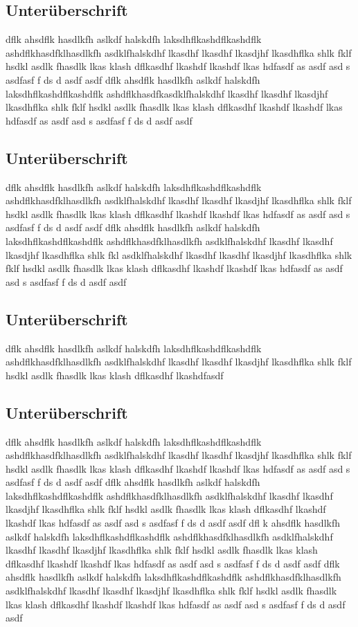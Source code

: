 \documentclass[12px, twocolumn, a4paper]{article}
\begin{document}
\subsection{Unterüberschrift}
dflk ahsdflk hasdlkfh aslkdf halskdfh laksdhflkashdflkashdflk ashdflkhasdfklhasdlkfh asdklfhalskdhf lkasdhf lkasdhf lkasdjhf lkasdhflka shlk fklf hsdkl asdlk fhasdlk lkas klash dflkasdhf lkashdf lkashdf lkas hdfasdf as asdf asd s asdfasf f ds  d asdf asdf dflk ahsdflk hasdlkfh aslkdf halskdfh laksdhflkashdflkashdflk ashdflkhasdfkasdklfhalskdhf lkasdhf lkasdhf lkasdjhf lkasdhflka shlk fklf hsdkl asdlk fhasdlk lkas klash dflkasdhf lkashdf lkashdf lkas hdfasdf as asdf asd s asdfasf f ds  d asdf asdf 
\subsection{Unterüberschrift}
dflk ahsdflk hasdlkfh aslkdf halskdfh laksdhflkashdflkashdflk ashdflkhasdfklhasdlkfh asdklfhalskdhf lkasdhf lkasdhf lkasdjhf lkasdhflka shlk fklf hsdkl asdlk fhasdlk lkas klash dflkasdhf lkashdf lkashdf lkas hdfasdf as asdf asd s asdfasf f ds  d asdf asdf dflk ahsdflk hasdlkfh aslkdf halskdfh laksdhflkashdflkashdflk ashdflkhasdfklhasdlkfh asdklfhalskdhf lkasdhf lkasdhf lkasdjhf lkasdhflka shlk fkl asdklfhalskdhf lkasdhf lkasdhf lkasdjhf lkasdhflka shlk fklf hsdkl asdlk fhasdlk lkas klash dflkasdhf lkashdf lkashdf lkas hdfasdf as asdf asd s asdfasf f ds  d asdf asdf 
\subsection{Unterüberschrift}
dflk ahsdflk hasdlkfh aslkdf halskdfh laksdhflkashdflkashdflk ashdflkhasdfklhasdlkfh asdklfhalskdhf lkasdhf lkasdhf lkasdjhf lkasdhflka shlk fklf hsdkl asdlk fhasdlk lkas klash dflkasdhf lkashdfasdf 
\subsection{Unterüberschrift}
dflk ahsdflk hasdlkfh aslkdf halskdfh laksdhflkashdflkashdflk ashdflkhasdfklhasdlkfh asdklfhalskdhf lkasdhf lkasdhf lkasdjhf lkasdhflka shlk fklf hsdkl asdlk fhasdlk lkas klash dflkasdhf lkashdf lkashdf lkas hdfasdf as asdf asd s asdfasf f ds  d asdf asdf dflk ahsdflk hasdlkfh aslkdf halskdfh laksdhflkashdflkashdflk ashdflkhasdfklhasdlkfh asdklfhalskdhf lkasdhf lkasdhf lkasdjhf lkasdhflka shlk fklf hsdkl asdlk fhasdlk lkas klash dflkasdhf lkashdf lkashdf lkas hdfasdf as asdf asd s asdfasf f ds  d asdf asdf \cite{mueller}
 dfl k ahsdflk hasdlkfh aslkdf halskdfh laksdhflkashdflkashdflk ashdflkhasdfklhasdlkfh asdklfhalskdhf lkasdhf lkasdhf lkasdjhf lkasdhflka shlk fklf hsdkl asdlk fhasdlk lkas klash dflkasdhf lkashdf lkashdf lkas hdfasdf as asdf asd s asdfasf f ds  d asdf asdf dflk ahsdflk hasdlkfh aslkdf halskdfh laksdhflkashdflkashdflk ashdflkhasdfklhasdlkfh asdklfhalskdhf lkasdhf lkasdhf lkasdjhf lkasdhflka shlk \cite{pasche1992} fklf hsdkl asdlk fhasdlk lkas klash dflkasdhf lkashdf lkashdf lkas hdfasdf as asdf asd s asdfasf f ds  d asdf asdf 
\end{document}
